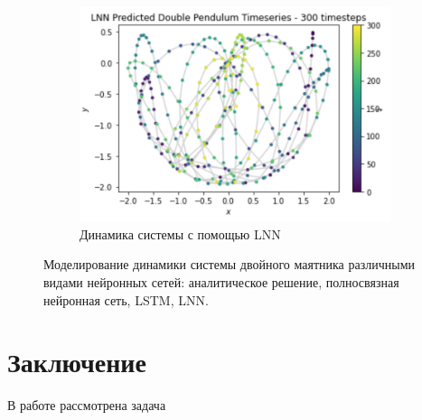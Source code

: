 \documentclass[12pt]{article}
\begin{document}
\begin{figure}[H]
\begin{subfigure}[b]{0.49\textwidth}
			\includegraphics[width=\textwidth]{lnn_pendulum.png}
			\caption{Динамика системы с помощью LNN}
			\label{fig:five over x}
		\end{subfigure}
		\caption{Моделирование динамики системы двойного маятника различными видами нейронных сетей: аналитическое решение, полносвязная нейронная сеть, LSTM, LNN.}
		\label{fig:three graphs}
	\end{figure}
	
	
	\section{Заключение}
	В работе рассмотрена задача 
	
	
	

		
	
	
\end{document}

